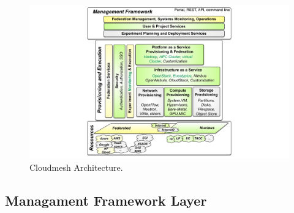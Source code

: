 \documentclass{tex/sig-alternate-2013}
\newcommand{\todo}[1]{{\color{red}{#1}}}
\newcommand{\READ}{\todo{READ}}
\begin{document}
\begin{figure}[htb]
  \centering
    \includegraphics[width=1.0\columnwidth]{images/cm-arch.pdf}
    \vspace{-24pt}
  \caption{Cloudmesh Architecture.}\label{F:arch}
\end{figure}

\subsection{Managament Framework Layer \READ}
\end{document}
